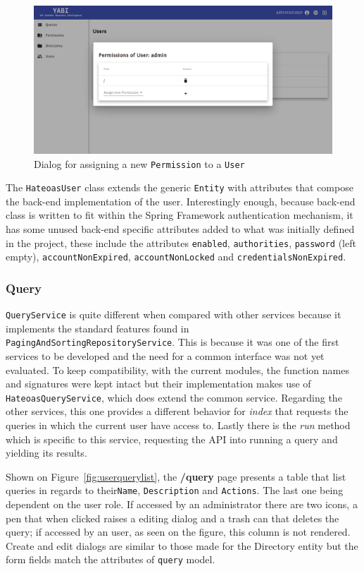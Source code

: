 \begin{figure}
  \centering
  \includegraphics[width=.8\textwidth]{images/screenshots/user/admin-permission-new}
  \caption{Dialog for assigning a new \texttt{Permission} to a \texttt{User}}\label{fig:adminpermisisonnew}
\end{figure}

The \texttt{HateoasUser} class extends the generic \texttt{Entity} with attributes that compose the back-end implementation of the user. Interestingly enough, because back-end class is written to fit within the Spring Framework authentication mechanism, it has some unused back-end specific attributes added to what was initially defined in the project, these include the attributes \texttt{enabled}, \texttt{authorities}, \texttt{password} (left empty), \texttt{accountNonExpired}, \texttt{accountNonLocked} and \texttt{credentialsNonExpired}.

\subsubsection{Query}
\texttt{QueryService} is quite different when compared with other services because it implements the standard features found in \texttt{PagingAndSortingRepositoryService}. This is because it was one of the first services to be developed and the need for a common interface was not yet evaluated. To keep compatibility, with the current modules, the function names and signatures were kept intact but their implementation makes use of \texttt{HateoasQueryService}, which does extend the common service. Regarding the other services, this one provides a different behavior for \textit{index} that requests the queries in which the current user have access to. Lastly there is the \textit{run} method which is specific to this service, requesting the \gls{API} into running a query and yielding its results.

Shown on Figure~\ref{fig:userquerylist}, the \textbf{/query} page presents a table that list queries in regards to their\texttt{Name}, \texttt{Description} and \texttt{Actions}. The last one being dependent on the user role. If accessed by an administrator there are two icons, a pen that when clicked raises a editing dialog and a trash can that deletes the query; if accessed by an user, as seen on the figure, this column is not rendered. Create and edit dialogs are similar to those made for the Directory entity but the form fields match the attributes of \texttt{query} model.

